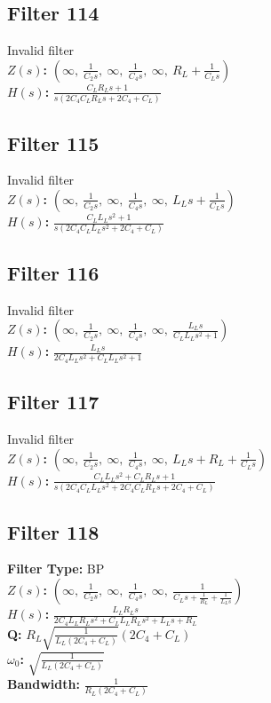 \documentclass{article}
\begin{document}
\subsection*{Filter 114}
Invalid filter \\ 
\textbf{$Z(s)$:} $\left( \infty, \  \frac{1}{C_{2} s}, \  \infty, \  \frac{1}{C_{4} s}, \  \infty, \  R_{L} + \frac{1}{C_{L} s}\right)$ \\ 
\textbf{$H(s)$:} $\frac{C_{L} R_{L} s + 1}{s \left(2 C_{4} C_{L} R_{L} s + 2 C_{4} + C_{L}\right)}$ \\ 
\subsection*{Filter 115}
Invalid filter \\ 
\textbf{$Z(s)$:} $\left( \infty, \  \frac{1}{C_{2} s}, \  \infty, \  \frac{1}{C_{4} s}, \  \infty, \  L_{L} s + \frac{1}{C_{L} s}\right)$ \\ 
\textbf{$H(s)$:} $\frac{C_{L} L_{L} s^{2} + 1}{s \left(2 C_{4} C_{L} L_{L} s^{2} + 2 C_{4} + C_{L}\right)}$ \\ 
\subsection*{Filter 116}
Invalid filter \\ 
\textbf{$Z(s)$:} $\left( \infty, \  \frac{1}{C_{2} s}, \  \infty, \  \frac{1}{C_{4} s}, \  \infty, \  \frac{L_{L} s}{C_{L} L_{L} s^{2} + 1}\right)$ \\ 
\textbf{$H(s)$:} $\frac{L_{L} s}{2 C_{4} L_{L} s^{2} + C_{L} L_{L} s^{2} + 1}$ \\ 
\subsection*{Filter 117}
Invalid filter \\ 
\textbf{$Z(s)$:} $\left( \infty, \  \frac{1}{C_{2} s}, \  \infty, \  \frac{1}{C_{4} s}, \  \infty, \  L_{L} s + R_{L} + \frac{1}{C_{L} s}\right)$ \\ 
\textbf{$H(s)$:} $\frac{C_{L} L_{L} s^{2} + C_{L} R_{L} s + 1}{s \left(2 C_{4} C_{L} L_{L} s^{2} + 2 C_{4} C_{L} R_{L} s + 2 C_{4} + C_{L}\right)}$ \\ 
\subsection*{Filter 118}
\textbf{Filter Type:} BP \\ 
\textbf{$Z(s)$:} $\left( \infty, \  \frac{1}{C_{2} s}, \  \infty, \  \frac{1}{C_{4} s}, \  \infty, \  \frac{1}{C_{L} s + \frac{1}{R_{L}} + \frac{1}{L_{L} s}}\right)$ \\ 
\textbf{$H(s)$:} $\frac{L_{L} R_{L} s}{2 C_{4} L_{L} R_{L} s^{2} + C_{L} L_{L} R_{L} s^{2} + L_{L} s + R_{L}}$ \\ 
\textbf{Q:} $R_{L} \sqrt{\frac{1}{L_{L} \left(2 C_{4} + C_{L}\right)}} \left(2 C_{4} + C_{L}\right)$ \\ 
\textbf{$\omega_0$:} $\sqrt{\frac{1}{L_{L} \left(2 C_{4} + C_{L}\right)}}$ \\ 
\textbf{Bandwidth:} $\frac{1}{R_{L} \left(2 C_{4} + C_{L}\right)}$ \\ 
\end{document}
